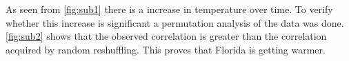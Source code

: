 \documentclass[12pt]{article}
\begin{document}
        As seen from \ref{fig:sub1} there is a increase in temperature over time. To verify whether this increase is significant a permutation analysis of the data was done.
        \ref{fig:sub2} shows that the observed correlation is greater than the correlation acquired by random reshuffling. This proves that Florida is getting warmer.

    
\end{document}
